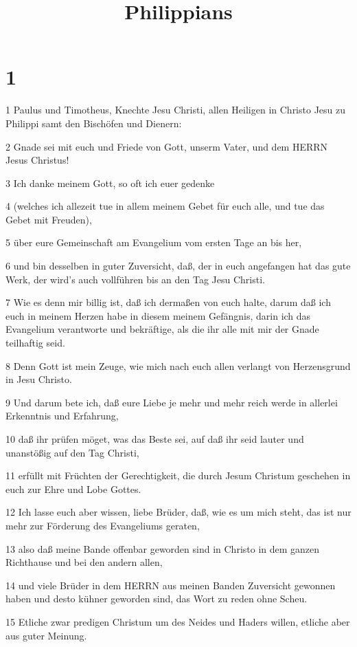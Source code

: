 

\title{Philippians}


\chapter{1}

\par 1 Paulus und Timotheus, Knechte Jesu Christi, allen Heiligen in Christo Jesu zu Philippi samt den Bischöfen und Dienern:
\par 2 Gnade sei mit euch und Friede von Gott, unserm Vater, und dem HERRN Jesus Christus!
\par 3 Ich danke meinem Gott, so oft ich euer gedenke
\par 4 (welches ich allezeit tue in allem meinem Gebet für euch alle, und tue das Gebet mit Freuden),
\par 5 über eure Gemeinschaft am Evangelium vom ersten Tage an bis her,
\par 6 und bin desselben in guter Zuversicht, daß, der in euch angefangen hat das gute Werk, der wird's auch vollführen bis an den Tag Jesu Christi.
\par 7 Wie es denn mir billig ist, daß ich dermaßen von euch halte, darum daß ich euch in meinem Herzen habe in diesem meinem Gefängnis, darin ich das Evangelium verantworte und bekräftige, als die ihr alle mit mir der Gnade teilhaftig seid.
\par 8 Denn Gott ist mein Zeuge, wie mich nach euch allen verlangt von Herzensgrund in Jesu Christo.
\par 9 Und darum bete ich, daß eure Liebe je mehr und mehr reich werde in allerlei Erkenntnis und Erfahrung,
\par 10 daß ihr prüfen möget, was das Beste sei, auf daß ihr seid lauter und unanstößig auf den Tag Christi,
\par 11 erfüllt mit Früchten der Gerechtigkeit, die durch Jesum Christum geschehen in euch zur Ehre und Lobe Gottes.
\par 12 Ich lasse euch aber wissen, liebe Brüder, daß, wie es um mich steht, das ist nur mehr zur Förderung des Evangeliums geraten,
\par 13 also daß meine Bande offenbar geworden sind in Christo in dem ganzen Richthause und bei den andern allen,
\par 14 und viele Brüder in dem HERRN aus meinen Banden Zuversicht gewonnen haben und desto kühner geworden sind, das Wort zu reden ohne Scheu.
\par 15 Etliche zwar predigen Christum um des Neides und Haders willen, etliche aber aus guter Meinung.
